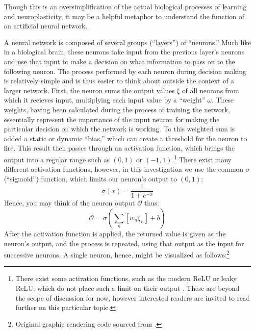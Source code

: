 \documentclass{article}
\begin{document}
Though this is an oversimplification of the actual biological processes of learning and neuroplasticity, it may be a helpful metaphor to understand the function of an artificial neural network.

A neural network is composed of several groups (``layers'') of ``neurons.'' Much like in a biological brain, these neurons take input from the previous layer's neurons and use that input to make a decision on what information to pass on to the following neuron. The process performed by each neuron during decision making is relatively simple and is thus easier to think about outside the context of a larger network. First, the neuron sums the output values $\xi$ of all neurons from which it recieves input, multiplying each input value by a ``weight'' $\omega$. These weights, having been calculated during the process of training the network, essentially represent the importance of the input neuron for making the particular decision on which the network is working. To this weighted sum is added a static or dynamic ``bias,'' which can create a threshold for the neuron to fire. This result then passes through an activation function, which brings the output into a regular range such as $(0, 1)$ or $(-1, 1)$.\footnote{There exist some activation functions, such as the modern ReLU or leaky ReLU, which do not place such a limit on their output \cite{activationfunctions}. These are beyond the scope of discussion for now, however interested readers are invited to read further on this particular topic.} There exist many different activation functions, however, in this investigation we use the common $\sigma$ (``sigmoid'') function, which limits our neuron's output to $(0, 1)$:
$$\sigma(x)=\frac{1}{1+e^{-x}}$$
Hence, you may think of the neuron output $\mathcal{O}$ thus:
$$\mathcal{O}=\sigma(\sum_n[w_{n}\xi_{n}]+b)$$
After the activation function is applied, the returned value is given as the neuron's output, and the process is repeated, using that output as the input for successive neurons. A single neuron, hence, might be visualized as follows:\footnote{Original graphic rendering code sourced from \cite{neurondiagrams}.}
\end{document}
